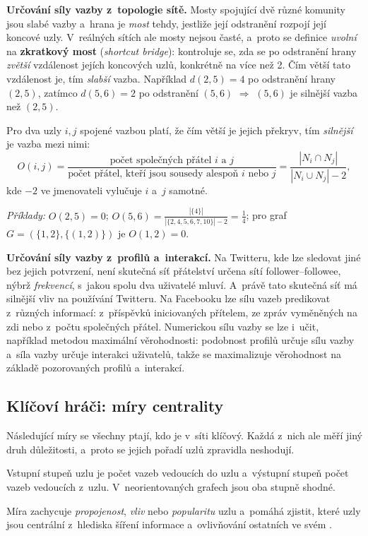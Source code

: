 \documentclass[11pt,a4paper]{article}
\theoremstyle{definition}
\begin{document}
\textbf{Určování síly vazby z~topologie sítě.} Mosty spojující dvě různé komunity jsou slabé
vazby a~hrana je \emph{most} tehdy, jestliže její odstranění rozpojí její koncové uzly.
V~reálných sítích ale mosty nejsou časté, a~proto se definice \emph{uvolní} na
\textbf{zkratkový most} (\emph{shortcut bridge}): kontroluje se, zda se po odstranění hrany
\emph{zvětší} vzdálenost jejích koncových uzlů, konkrétně na více než 2. Čím větší tato
vzdálenost je, tím \emph{slabší} vazba. Například $d(2,5)=4$ po odstranění hrany $(2,5)$,
zatímco $d(5,6)=2$ po odstranění $(5,6)$ $\Rightarrow$ $(5,6)$ je silnější vazba než $(2,5)$.

\begin{defbox}
Pro dva uzly $i,j$ spojené vazbou platí, že čím větší je jejich překryv, tím \emph{silnější}
je vazba mezi nimi:
\[ O(i,j)=\frac{\text{počet společných přátel } i \text{ a } j}
   {\text{počet přátel, kteří jsou sousedy alespoň }i\text{ nebo }j}
   =\frac{|N_i\cap N_j|}{|N_i\cup N_j|-2}, \]
kde $-2$ ve jmenovateli vylučuje $i$ a~$j$ samotné.

\emph{Příklady:} $O(2,5)=0$; $O(5,6)=\frac{|\{4\}|}{|\{2,4,5,6,7,10\}|-2}=\frac14$;
pro graf $G=(\{1,2\},\{(1,2)\})$ je $O(1,2)=0$.
\end{defbox}

\textbf{Určování síly vazby z~profilů a~interakcí.} Na Twitteru, kde lze sledovat jiné bez
jejich potvrzení, není skutečná síť přátelství určena sítí follower--followee, nýbrž
\emph{frekvencí}, s~jakou spolu dva uživatelé mluví. A~právě tato skutečná síť má silnější
vliv na používání Twitteru. Na Facebooku lze sílu vazeb predikovat z~různých informací:
z~příspěvků iniciovaných přítelem, ze zpráv vyměněných na zdi nebo z~počtu společných
přátel. Numerickou sílu vazby se lze i~učit, například metodou maximální věrohodnosti:
podobnost profilů určuje sílu vazby a~síla vazby určuje interakci uživatelů, takže se
maximalizuje věrohodnost na základě pozorovaných profilů a~interakcí.

\subsection{Klíčoví hráči: míry centrality}

Následující míry se všechny ptají, kdo je v~síti klíčový. Každá z~nich ale měří jiný druh
důležitosti, a~proto se jejich pořadí uzlů zpravidla neshodují.

\begin{defbox}
Vstupní stupeň uzlu je počet vazeb vedoucích do uzlu a~výstupní stupeň počet vazeb vedoucích
z~uzlu. V~neorientovaných grafech jsou oba stupně shodné.

Míra zachycuje \emph{propojenost}, \emph{vliv} nebo \emph{popularitu} uzlu a~pomáhá zjistit,
které uzly jsou centrální z~hlediska šíření informace a~ovlivňování ostatních ve svém
.
\end{defbox}
\end{document}
